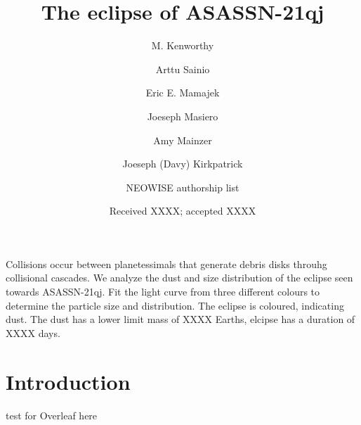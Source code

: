 \documentclass{aa}
\begin{document}
 

   \title{The eclipse of ASASSN-21qj}

   \author{M. Kenworthy
          \and
          Arttu Sainio
          \and
          Eric E. Mamajek
          \and
          Joeseph Masiero
          \and 
          Amy Mainzer
          \and
          Joeseph (Davy) Kirkpatrick
          \and 
          NEOWISE authorship list
          }


   \date{Received XXXX; accepted XXXX}

 
  \abstract
   {Collisions occur between planetessimals that generate debris disks throuhg collisional cascades.}
   {We analyze the dust and size distribution of the eclipse seen towards ASASSN-21qj.}
   {Fit the light curve from three different colours to determine the particle size and distribution.}
   {The eclipse is coloured, indicating dust.
   The dust has a lower limit mass of XXXX Earths, elcipse has a duration of XXXX days.}
   {}


   \maketitle
%

   \section{Introduction}

test for Overleaf here
\end{document}
